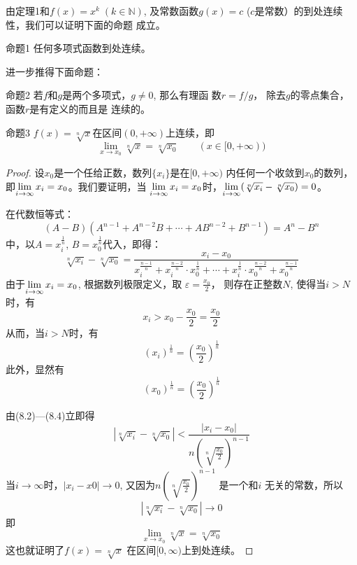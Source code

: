 由定理1和$f(x)=x^k\; (k\in\mathbb{N})$, 及常数函数$g(x)=c$ ($c$是常数）的到处连续性，我们可以证明下面的命题
成立。

\begin{blk}{命题1}
    任何多项式函数到处连续。
\end{blk}

进一步推得下面命题：

\begin{blk}{命题2}
    若$f$和$g$是两个多项式，$g\ne 0$, 那么有理函
数$r=f/g$，
除去$g$的零点集合，函数$r$是有定义的而且是
连续的。
\end{blk}

\begin{blk}{命题3}
    $f(x)=\sqrt[n]{x}$在区间$(0,+\infty)$上连续，即 
\[\lim_{x\to x_0}\sqrt[n]{x}=\sqrt[n]{x_0}\qquad (x\in[0,+\infty))\]
\end{blk}

\begin{proof}
    设$x_0$是一个任给正数，数列$\{x_i\}$是在$[0,+\infty)$
内任何一个收敛到$x_0$的数列，即$\displaystyle\lim_{i\to \infty} x_i=x_0$。我们要证明，当
$\displaystyle\lim_{i\to\infty} x_i=x_0$时，$\displaystyle\lim_{i\to\infty} (\sqrt[n]{x_i}-\sqrt[n]{x_0})=0$。

在代数恒等式：
\[(A-B)\left(A^{n-1}+A^{n-2}B+\cdots +AB^{n-2}+B^{n-1}\right)=A^n-B^n\]
中，以$A=x_i^{\tfrac{1}{n}}$, $B=x_0^{\tfrac{1}{n}}$代入，即得：
\begin{equation}
\sqrt[n]{x_i}-\sqrt[n]{x_0}=\frac{x_i-x_0}{x_i^{\tfrac{n-1}{n}}+x^{\tfrac{n-2}{n}}_i\cdot x_0^{\tfrac{1}{n}}+\cdots +x^{\tfrac{1}{n}}_i\cdot x_0^{\tfrac{n-2}{n}} + x_0^{\tfrac{n-1}{n}}} 
\end{equation}
由于$\displaystyle\lim_{i\to\infty}x_i=x_0$, 根据数列极限定义，取
$\varepsilon=\frac{x_0}{2}$，
则存在正整数$N$, 使得当$i>N$时，有
\[x_i>x_0-\frac{x_0}{2}=\frac{x_0}{2}\]
从而，当$i>N$时，有
\begin{equation}
    (x_i)^{\tfrac{1}{n}}=\left(\frac{x_0}{2}\right)^{\tfrac{1}{n}}
\end{equation}
此外，显然有
\begin{equation}
    (x_0)^{\tfrac{1}{n}}=\left(\frac{x_0}{2}\right)^{\tfrac{1}{n}}
\end{equation}

由(8.2)---(8.4)立即得
\[\left|\sqrt[n]{x_i}-\sqrt[n]{x_0}\right|<\frac{|x_i-x_0|}{n\left(\sqrt[n]{\frac{x_0}{2}}\right)^{n-1}}\]
当$i\to\infty$时，$|x_i-x0|\to 0$, 又因为$n\left(\sqrt[n]{\frac{x_0}{2}}\right)^{n-1}$
是一个和$i$
无关的常数，所以
\[\left|\sqrt[n]{x_i}-\sqrt[n]{x_0}\right|\to 0\]
即
\[\lim_{x\to x_0} \sqrt[n]{x}=\sqrt[n]{x_0}\]
这也就证明了$f(x)=\sqrt[n]{x}$ 在区间$[0,\infty)$上到处连续。
\end{proof}

